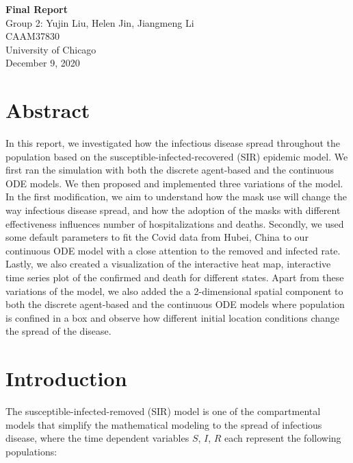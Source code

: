 \documentclass{article}
\begin{document}
\begin{titlepage}
  \begin{center}

    \huge
    \textbf{Final Report}\\
    \vspace{4.5cm}
    \LARGE
    Group 2: Yujin Liu, Helen Jin, Jiangmeng Li\\
    \vspace{4.5cm}
    \Large
    CAAM37830\\
    \vspace{1cm}
    University of Chicago\\
    \vspace{1cm}
    December 9, 2020

  \end{center}

\end{titlepage}

\section{Abstract}
In this report, we investigated how the infectious disease spread throughout the population based on the susceptible-infected-recovered (SIR) epidemic model. We first ran the simulation with both the discrete agent-based and the continuous ODE models. We then proposed and implemented three variations of the model. In the first modification, we aim to understand how the mask use will change the way infectious disease spread, and how the adoption of the masks with different effectiveness influences number of hospitalizations and deaths. Secondly, we used some default parameters to fit the Covid data from Hubei, China to our continuous ODE model with a close attention to the removed and infected rate. Lastly, we also created a visualization of the interactive heat map, interactive time series plot of the confirmed and death for different states. Apart from these variations of the model, we also added the  a 2-dimensional spatial component to both the discrete agent-based and the continuous ODE models where population is confined in a box and observe how different initial location conditions change the spread of the disease.

\section{Introduction}
The susceptible-infected-removed (SIR) model is one of the compartmental models that simplify the mathematical modeling to the spread of infectious disease, where the time dependent variables $S$, $I$, $R$ each represent the following populations:
\end{document}
